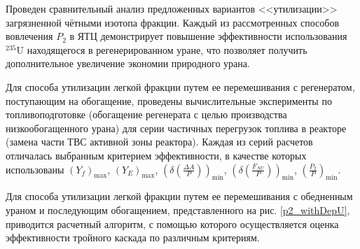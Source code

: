 Проведен сравнительный анализ предложенных вариантов <<утилизации>> загрязненной чётными изотопа фракции. Каждый из рассмотренных способов вовлечения $P_2$ в ЯТЦ демонстрирует повышение эффективности использования $^{235}$U находящегося в регенерированном уране, что позволяет получить дополнительное увеличение экономии природного урана.

Для способа утилизации легкой фракции путем ее перемешивания с регенератом, поступающим на обогащение, проведены вычислительные эксперименты по топливоподготовке (обогащение регенерата с целью производства низкообогащенного урана) для серии частичных перегрузок топлива в реакторе (замена части ТВС активной зоны реактора). Каждая из серий расчетов отличалась выбранным критерием эффективности, в качестве которых использованы $(Y_f)_\text{max}$, $(Y_{E})_\text{max}$, $(\delta(\frac{\Delta A}{P}))_\text{min}$, $(\delta(\frac{F_{NU}}{P}))_\text{min}$, $(\frac{P_2}{P})_\text{min}$. 

Для способа утилизации легкой фракции путем ее перемешивания с обедненным ураном и последующим обогащением, представленного на рис. \ref{p2_withDepU}, приводится расчетный алгоритм, с помощью которого осуществляется оценка эффективности тройного каскада по различным критериям.

